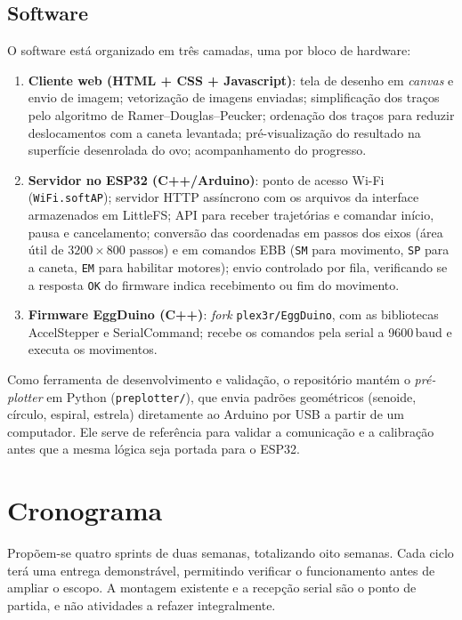 \documentclass[10pt,a4paper]{article}
\begin{document}
\subsection{Software}

O software está organizado em três camadas, uma por bloco de hardware:

\begin{enumerate}
  \item \textbf{Cliente web (HTML + CSS + Javascript)}: tela de desenho em \textit{canvas} e envio de imagem; vetorização de imagens enviadas; simplificação dos traços pelo algoritmo de Ramer--Douglas--Peucker; ordenação dos traços para reduzir deslocamentos com a caneta levantada; pré-visualização do resultado na superfície desenrolada do ovo; acompanhamento do progresso.
 \item \textbf{Servidor no ESP32 (C++/Arduino)}: ponto de acesso Wi-Fi (\texttt{WiFi.softAP}); servidor HTTP assíncrono com os arquivos da interface armazenados em LittleFS; API para receber trajetórias e comandar início, pausa e cancelamento; conversão das coordenadas em passos dos eixos (área útil de $3200\times800$ passos) e em comandos EBB (\texttt{SM} para movimento, \texttt{SP} para a caneta, \texttt{EM} para habilitar motores); envio controlado por fila, verificando se a resposta \texttt{OK} do firmware indica recebimento ou fim do movimento.
  \item \textbf{Firmware EggDuino (C++)}: \textit{fork} \texttt{plex3r/\allowbreak EggDuino}, com as bibliotecas AccelStepper e SerialCommand; recebe os comandos pela serial a 9600\,baud e executa os movimentos.
\end{enumerate}

Como ferramenta de desenvolvimento e validação, o repositório mantém o \textit{pré-plotter} em Python (\texttt{preplotter/}), que envia padrões geométricos (senoide, círculo, espiral, estrela) diretamente ao Arduino por USB a partir de um computador. Ele serve de referência para validar a comunicação e a calibração antes que a mesma lógica seja portada para o ESP32.

\section{Cronograma}

Propõem-se quatro sprints de duas semanas, totalizando oito semanas. Cada ciclo terá uma
entrega demonstrável, permitindo verificar o funcionamento antes de ampliar
o escopo. A montagem existente e a recepção serial são o ponto de partida,
e não atividades a refazer integralmente.
\end{document}
